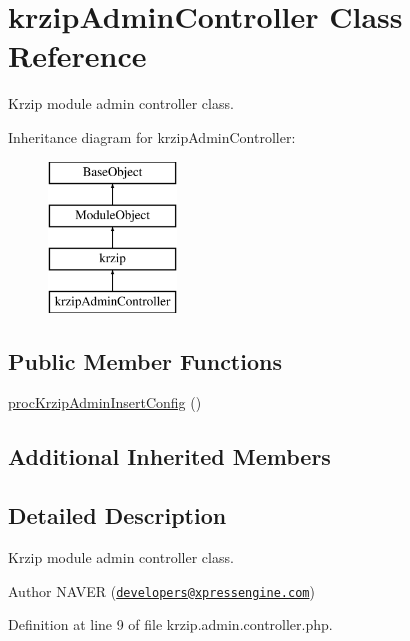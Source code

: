 \hypertarget{classkrzipAdminController}{\section{krzip\-Admin\-Controller Class Reference}
\label{classkrzipAdminController}
}


Krzip module admin controller class.  


Inheritance diagram for krzip\-Admin\-Controller\-:\begin{figure}[H]
\begin{center}
\leavevmode
\includegraphics[height=4.000000cm]{classkrzipAdminController}
\end{center}
\end{figure}
\subsection*{Public Member Functions}
\begin{DoxyCompactItemize}
\item 
\hyperlink{classkrzipAdminController_a34f2b4f776e6074b135334aadf866ea3}{proc\-Krzip\-Admin\-Insert\-Config} ()
\end{DoxyCompactItemize}
\subsection*{Additional Inherited Members}


\subsection{Detailed Description}
Krzip module admin controller class. 

\begin{DoxyAuthor}{Author}
N\-A\-V\-E\-R (\href{mailto:developers@xpressengine.com}{\tt developers@xpressengine.\-com}) 
\end{DoxyAuthor}


Definition at line 9 of file krzip.\-admin.\-controller.\-php.



